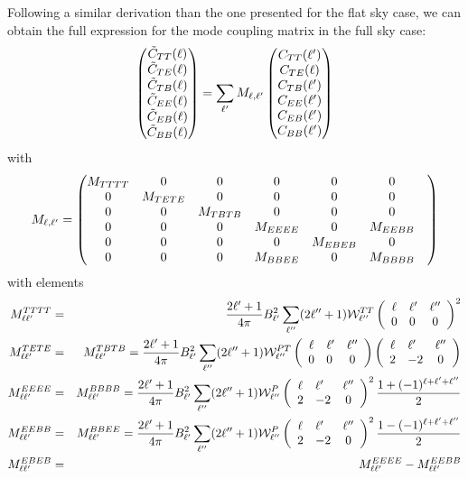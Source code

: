 \documentclass[a4paper, 11pt]{article}
\def\ba{\begin{eqnarray}}
\def\ea{\end{eqnarray}}
\begin{document}
Following a similar derivation than the one presented for the flat sky case, we can obtain the full expression for the mode coupling matrix in the full sky case: 
\ba
 \begin{pmatrix}  \tilde{C}_{TT}(\ell) \cr \tilde{C}_{TE}(\ell)\cr \tilde{C}_{TB}(\ell)\cr \tilde{C}_{EE}(\ell)\cr \tilde{C}_{EB}(\ell)\cr \tilde{C}_{BB}(\ell)\cr \end{pmatrix} = \sum_{\ell'} M_{\ell, \ell'} 
  \begin{pmatrix}  C_{TT}(\ell') \cr C_{TE}(\ell)\cr C_{TB}(\ell')\cr C_{EE}(\ell')\cr C_{EB}(\ell')\cr C_{BB}(\ell')\cr \end{pmatrix}
\ea
with
\ba
M_{\ell, \ell'}=   
\begin{pmatrix} 
M_{TTTT} &
0 & 
0 &
0 & 
0 & 
0 & 
\cr
0 & 
M_{TETE} & 
0 &
0 & 
0 & 
0 & 
\cr
0 &
0 & 
M_{TBTB} & 
0 & 
0 & 
0 & 
  \cr
0 &
0 & 
0 &
M_{EEEE}& 
0 &
M_{EEBB} &  
 \cr
0 &
0 & 
0 &
0 & 
M_{EBEB}  &
0&  
\cr
0 &
0 & 
0 &
M_{BBEE} & 
0  &
M_{BBBB}&  
\cr
\end{pmatrix}
\ea
with elements
\ba
M^{TTTT}_{\ell \ell'}&=&  \frac{2\ell'+1}{4\pi} B^{2}_{\ell'} \sum_{\ell''} (2\ell''+1) {\cal W}^{TT}_{\ell''}    
\left(\begin{array}{clcr}
\ell & \ell' & \ell''\\
0 & 0 & 0 \end{array}\right)^{2}
 \nonumber \\
M^{TETE}_{\ell \ell'}&=& M^{TBTB}_{\ell \ell'}= \frac{2\ell'+1}{4\pi}B^{2}_{\ell'}\sum_{\ell''} (2\ell''+1) {\cal W}^{PT}_{\ell''}    
\left(\begin{array}{clcr}
\ell & \ell' & \ell''\\
0 & 0 & 0 \end{array}\right)
\left(\begin{array}{clcr}
\ell & \ell' & \ell''\\
2 & -2 & 0 \end{array}\right) \nonumber \\
M^{EEEE}_{\ell \ell'} &=&M^{BBBB}_{\ell \ell'}=  \frac{2\ell'+1}{4\pi} B^{2}_{\ell'} \sum_{\ell''} (2\ell''+1) {\cal W}^{P}_{\ell''}
\left(\begin{array}{clcr}
\ell & \ell' & \ell''\\
2 & -2 & 0 \end{array}\right)^{2}
\frac{1 + (-1)^{\ell+ \ell' + \ell''}}{2} \nonumber \\
M^{EEBB}_{\ell \ell'} &=&M^{BBEE}_{\ell \ell'}=  \frac{2\ell'+1}{4\pi} B^{2}_{\ell'} \sum_{\ell''} (2\ell''+1) {\cal W}^{P}_{\ell''}
\left(\begin{array}{clcr}
\ell & \ell' & \ell''\\
2 & -2 & 0 \end{array}\right)^{2}
\frac{1 - (-1)^{\ell+ \ell' + \ell''}}{2} \nonumber \\
M^{EBEB}_{\ell \ell'}&=& M^{EEEE}_{\ell \ell'}-M^{EEBB}_{\ell \ell'} 
\ea
\end{document}

